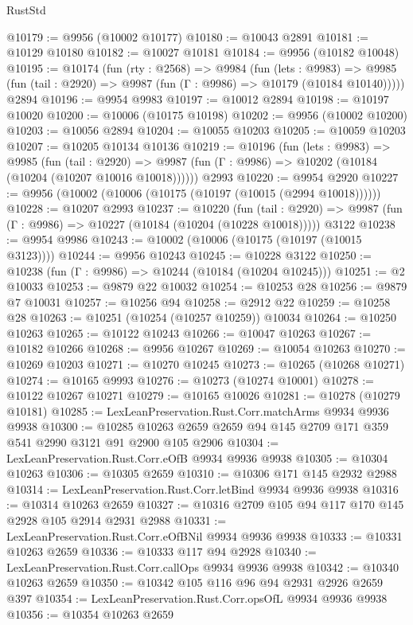 \begin{lexlean}{RustStd}
\begin{coremodule}
@10179 := @9956 (@10002 @10177)
@10180 := @10043 @2891
@10181 := @10129 @10180
@10182 := @10027 @10181
@10184 := @9956 (@10182 @10048)
@10195 := @10174
    (fun (rty : @2568) =>
    @9984
      (fun (lets : @9983) =>
      @9985 (fun (tail : @2920) => @9987 (fun (Γ : @9986) => @10179 (@10184 @10140)))))
    @2894
@10196 := @9954 @9983
@10197 := @10012 @2894
@10198 := @10197 @10020
@10200 := @10006 (@10175 @10198)
@10202 := @9956 (@10002 @10200)
@10203 := @10056 @2894
@10204 := @10055 @10203
@10205 := @10059 @10203
@10207 := @10205 @10134 @10136
@10219 := @10196
    (fun (lets : @9983) =>
    @9985
      (fun (tail : @2920) =>
      @9987 (fun (Γ : @9986) => @10202 (@10184 (@10204 (@10207 @10016 @10018))))))
    @2993
@10220 := @9954 @2920
@10227 := @9956 (@10002 (@10006 (@10175 (@10197 (@10015 (@2994 @10018))))))
@10228 := @10207 @2993
@10237 := @10220
    (fun (tail : @2920) => @9987 (fun (Γ : @9986) => @10227 (@10184 (@10204 (@10228 @10018)))))
    @3122
@10238 := @9954 @9986
@10243 := @10002 (@10006 (@10175 (@10197 (@10015 @3123))))
@10244 := @9956 @10243
@10245 := @10228 @3122
@10250 := @10238 (fun (Γ : @9986) => @10244 (@10184 (@10204 @10245)))
@10251 := @2 @10033
@10253 := @9879 @22 @10032
@10254 := @10253 @28
@10256 := @9879 @7 @10031
@10257 := @10256 @94
@10258 := @2912 @22
@10259 := @10258 @28
@10263 := @10251 (@10254 (@10257 @10259)) @10034
@10264 := @10250 @10263
@10265 := @10122 @10243
@10266 := @10047 @10263
@10267 := @10182 @10266
@10268 := @9956 @10267
@10269 := @10054 @10263
@10270 := @10269 @10203
@10271 := @10270 @10245
@10273 := @10265 (@10268 @10271)
@10274 := @10165 @9993
@10276 := @10273 (@10274 @10001)
@10278 := @10122 @10267 @10271
@10279 := @10165 @10026
@10281 := @10278 (@10279 @10181)
@10285 := LexLeanPreservation.Rust.Corr.matchArms @9934 @9936 @9938
@10300 := @10285 @10263 @2659 @2659 @94 @145 @2709 @171 @359 @541 @2990 @3121 @91 @2900 @105 @2906
@10304 := LexLeanPreservation.Rust.Corr.eOfB @9934 @9936 @9938
@10305 := @10304 @10263
@10306 := @10305 @2659
@10310 := @10306 @171 @145 @2932 @2988
@10314 := LexLeanPreservation.Rust.Corr.letBind @9934 @9936 @9938
@10316 := @10314 @10263 @2659
@10327 := @10316 @2709 @105 @94 @117 @170 @145 @2928 @105 @2914 @2931 @2988
@10331 := LexLeanPreservation.Rust.Corr.eOfBNil @9934 @9936 @9938
@10333 := @10331 @10263 @2659
@10336 := @10333 @117 @94 @2928
@10340 := LexLeanPreservation.Rust.Corr.callOps @9934 @9936 @9938
@10342 := @10340 @10263 @2659
@10350 := @10342 @105 @116 @96 @94 @2931 @2926 @2659 @397
@10354 := LexLeanPreservation.Rust.Corr.opsOfL @9934 @9936 @9938
@10356 := @10354 @10263 @2659

\end{coremodule}
\end{lexlean}
